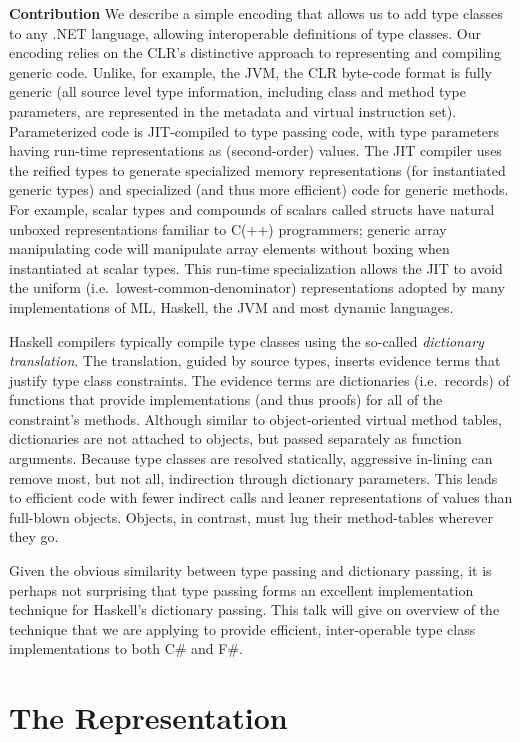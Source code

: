 \documentclass[preprint]{sig-alternate-05-2015}
\begin{document}
{\bf Contribution} We describe a simple encoding that allows us to add type classes to
any .NET language, allowing interoperable definitions of type
classes. Our encoding relies on the CLR's distinctive approach to
representing and compiling generic code\cite{genericspldi,genericspopl}. Unlike, for example, the JVM, the CLR
byte-code format is fully generic (all source level type information,
including class and method type parameters, are represented in the
metadata and virtual instruction set).  Parameterized code is JIT-compiled to type passing code,
with type parameters having run-time representations as (second-order)
values.  The JIT compiler uses the reified types to generate
specialized memory representations (for instantiated generic types)
and specialized (and thus more efficient) code for generic
methods. For example, scalar types and compounds of scalars called
structs have natural unboxed representations familiar to C(++)
programmers; generic array manipulating code will manipulate array
elements without boxing when instantiated at scalar types.  This run-time
specialization allows the JIT to avoid the uniform (i.e.\ lowest-common-denominator) representations adopted by many implementations of ML, 
Haskell, the JVM and most dynamic languages.

Haskell compilers typically compile type classes using the so-called
\emph{dictionary translation}.  The translation, guided by source
types, inserts evidence terms that justify type class constraints. The evidence terms are dictionaries (i.e.\ records) of functions that provide implementations (and thus proofs) for all of the constraint's methods. Although similar to
object-oriented virtual method tables, dictionaries are not attached to
objects, but passed separately as function arguments.  Because type
classes are resolved statically, aggressive in-lining can remove most,
but not all, indirection through dictionary parameters. This leads to
efficient code with fewer indirect calls and leaner representations of values than full-blown objects. Objects, in contrast, must lug their method-tables wherever they go.

Given the obvious similarity between type passing and dictionary
passing, it is perhaps not surprising that type passing forms an
excellent implementation technique for Haskell's dictionary passing. 
This talk will give on overview of the technique that we are applying to provide
efficient, inter-operable type class implementations to both C\# and F\#.


\section{The Representation}
\end{document}
